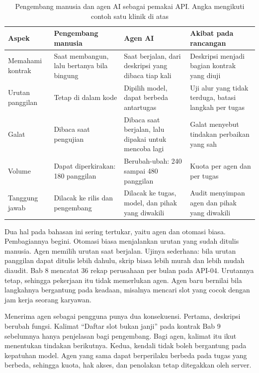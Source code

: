 \begin{table}[!htb]
  \centering
  \caption{Pengembang manusia dan agen AI sebagai pemakai API. Angka mengikuti contoh satu klinik di atas}
  \label{tab:ch14-pengembang-agen}
  \footnotesize
  \begin{tabularx}{\textwidth}{H{2.2cm}GGG}
    \hline
    \textbf{Aspek} & \textbf{Pengembang manusia} & \textbf{Agen AI} & \textbf{Akibat pada rancangan} \\ \hline
    Memahami kontrak & Saat membangun, lalu bertanya bila bingung & Saat berjalan, dari deskripsi yang dibaca tiap kali & Deskripsi menjadi bagian kontrak yang diuji \\ \hline
    Urutan panggilan & Tetap di dalam kode & Dipilih model, dapat berbeda antartugas & Uji alur yang tidak terduga, batasi langkah per tugas \\ \hline
    Galat & Dibaca saat pengujian & Dibaca saat berjalan, lalu dipakai untuk mencoba lagi & Galat menyebut tindakan perbaikan yang sah \\ \hline
    Volume & Dapat diperkirakan: 180 panggilan & Berubah-ubah: 240 sampai 480 panggilan & Kuota per agen dan per tugas \\ \hline
    Tanggung jawab & Dilacak ke rilis dan pengembang & Dilacak ke tugas, model, dan pihak yang diwakili & Audit menyimpan agen dan pihak yang diwakili \\ \hline
  \end{tabularx}
\end{table}

Dua hal pada bahasan ini sering tertukar, yaitu agen dan otomasi biasa. Pembagiannya begini. Otomasi biasa menjalankan urutan yang sudah ditulis
manusia. Agen memilih urutan saat berjalan. Ujinya sederhana: bila urutan panggilan dapat ditulis lebih dahulu, skrip biasa lebih murah dan lebih mudah
diaudit. Bab 8 mencatat 36 rekap perusahaan per bulan pada API-04. Urutannya tetap, sehingga pekerjaan itu tidak memerlukan agen. Agen baru bernilai
bila langkahnya bergantung pada keadaan, misalnya mencari slot yang cocok dengan jam kerja seorang karyawan.

Menerima agen sebagai pengguna punya dua konsekuensi. Pertama, deskripsi berubah fungsi. Kalimat ``Daftar slot bukan janji'' pada kontrak Bab 9 sebelumnya
hanya penjelasan bagi pengembang. Bagi agen, kalimat itu ikut menentukan tindakan berikutnya. Kedua, kendali tidak boleh bergantung pada kepatuhan model.
Agen yang sama dapat berperilaku berbeda pada tugas yang berbeda, sehingga kuota, hak akses, dan penolakan tetap ditegakkan oleh server.

